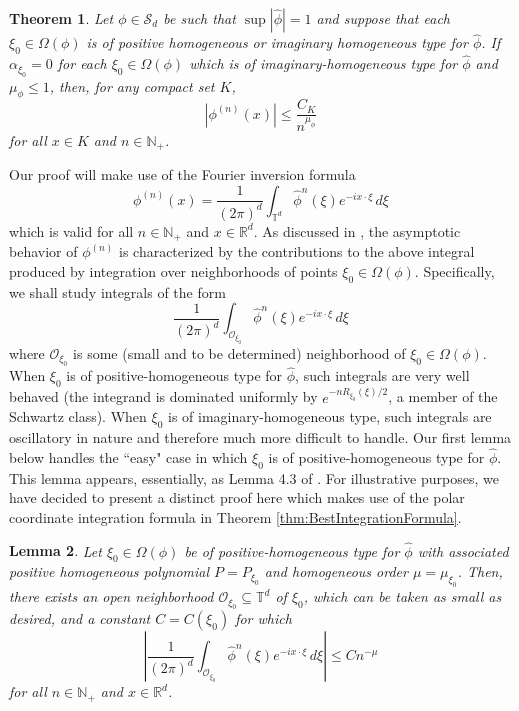 \documentclass[11pt]{article}
\newtheorem{theorem}{Theorem}[section]
\newtheorem{lemma}[theorem]{Lemma}
\begin{document}
\begin{theorem}\label{thm:ConvolutionPowerEstimate}
Let $\phi\in\mathcal{S}_d$ be such that $\sup |\widehat{\phi}|=1$ and suppose that each $\xi_0\in\Omega(\phi)$ is of positive homogeneous or imaginary homogeneous type for $\widehat{\phi}$. If $\alpha_{\xi_0}=0$ for each $\xi_0\in\Omega(\phi)$ which is of imaginary-homogeneous type for $\widehat{\phi}$ and $\mu_{\phi}\leq 1$, then, for any compact set $K$, 
\begin{equation*}
    \left|\phi^{(n)}(x)\right|\leq\frac{C_K}{n^{\mu_\phi}}
\end{equation*}
for all $x\in K$ and $n\in\mathbb{N}_+$.
\end{theorem}
\noindent Our proof will make use of the Fourier inversion formula
\begin{equation}\label{eq:FourierInversionConvolutionPower}
\phi^{(n)}(x)=\frac{1}{(2\pi)^d}\int_{\mathbb{T}^d}\widehat{\phi}^n(\xi)e^{-ix\cdot\xi}\,d\xi
\end{equation}
which is valid for all $n\in\mathbb{N}_+$ and $x\in\mathbb{R}^d$. As discussed in \cite{Randles2017}, the asymptotic behavior of $\phi^{(n)}$ is characterized by the contributions to the above integral produced by integration over neighborhoods of points $\xi_0\in\Omega(\phi).$ Specifically, we shall study integrals of the form
\begin{equation}\label{eq:LocalizedFourierInversionConvolutionPower}
\frac{1}{(2\pi)^d}\int_{\mathcal{O}_{\xi_0}}\widehat{\phi}^n(\xi)e^{-ix\cdot\xi}\,d\xi
\end{equation}
where $\mathcal{O}_{\xi_0}$ is some (small and to be determined) neighborhood of $\xi_0\in\Omega(\phi)$. When $\xi_0$ is of positive-homogeneous type for $\widehat{\phi}$, such integrals are very well behaved (the integrand is dominated uniformly by $e^{-nR_{\xi_0}(\xi)/2}$, a member of the Schwartz class). When $\xi_0$ is of imaginary-homogeneous type, such integrals are oscillatory in nature and therefore much more difficult to handle. Our first lemma below handles the ``easy" case in which $\xi_0$ is of positive-homogeneous type for $\widehat{\phi}$. This lemma appears, essentially, as Lemma 4.3 of \cite{Randles2017}. For illustrative purposes, we have decided to present a distinct proof here which makes use of the polar coordinate integration formula in Theorem \ref{thm:BestIntegrationFormula}. 
\begin{lemma}\label{lem:EstPosHom}
Let $\xi_0\in\Omega(\phi)$ be of positive-homogeneous type for $\widehat{\phi}$ with associated positive homogeneous polynomial $P=P_{\xi_0}$ and homogeneous order $\mu=\mu_{\xi_0}$. Then, there exists an open neighborhood $\mathcal{O}_{\xi_0}\subseteq\mathbb{T}^d$ of $\xi_0$, which can be taken as small as desired, and a constant $C=C(\xi_0)$ for which
\begin{equation*}
    \left|\frac{1}{(2\pi)^d}\int_{\mathcal{O}_{\xi_0}}\widehat{\phi}^n(\xi)e^{-ix\cdot\xi}\,d\xi\right|\leq 
    C n^{-\mu}
\end{equation*}
for all $n\in\mathbb{N}_+$ and $x\in\mathbb{R}^d$.
\end{lemma}
\end{document}
